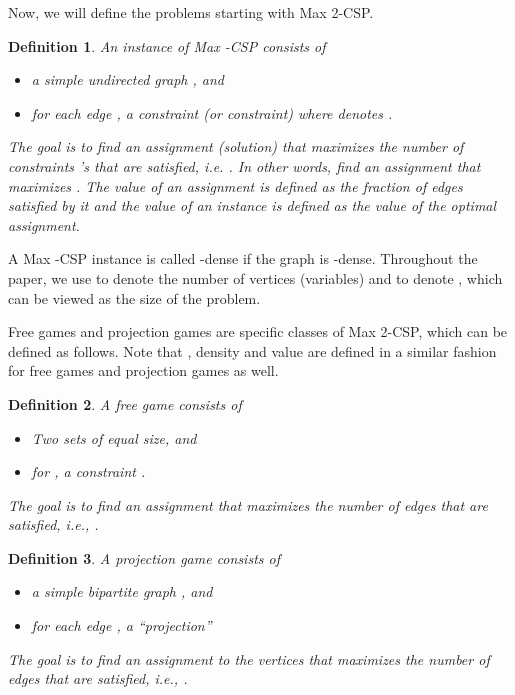 \documentclass{article}
\newtheorem{definition}{Definition}
\begin{document}
Now, we will define the problems starting with {\sc Max 2-CSP}. \\

\begin{definition}
An instance  of {\sc Max -CSP} consists of
\begin{itemize}
  \item a simple undirected graph , and
  \item for each edge , a constraint (or constraint)  where  denotes .
\end{itemize}
The goal is to find an assignment (solution)  that maximizes the number of constraints 's that are satisfied, i.e. . In other words, find an assignment  that maximizes . The value of an assignment is defined as the fraction of edges satisfied by it and the value of an instance is defined as the value of the optimal assignment.
\end{definition}

A {\sc Max -CSP} instance  is called -dense if the graph  is -dense. Throughout the paper, we use  to denote the number of vertices (variables)  and  to denote , which can be viewed as the size of the problem.

Free games and projection games are specific classes of {\sc Max 2-CSP}, which can be defined as follows. Note that , density and value are defined in a similar fashion for free games and projection games as well. \\

\begin{definition} A free game  consists of
\begin{itemize}
  \item Two sets  of equal size, and
  \item for , a constraint .
\end{itemize}
The goal is to find an assignment  that maximizes the number of edges  that are satisfied, i.e., . \\
\end{definition}

\begin{definition}
A projection game  consists of
\begin{itemize}
  \item a simple bipartite graph , and
  \item for each edge , a ``projection'' 
\end{itemize}
The goal is to find an assignment to the vertices  that maximizes the number of edges  that are satisfied, i.e., .
\end{definition}
\end{document}
